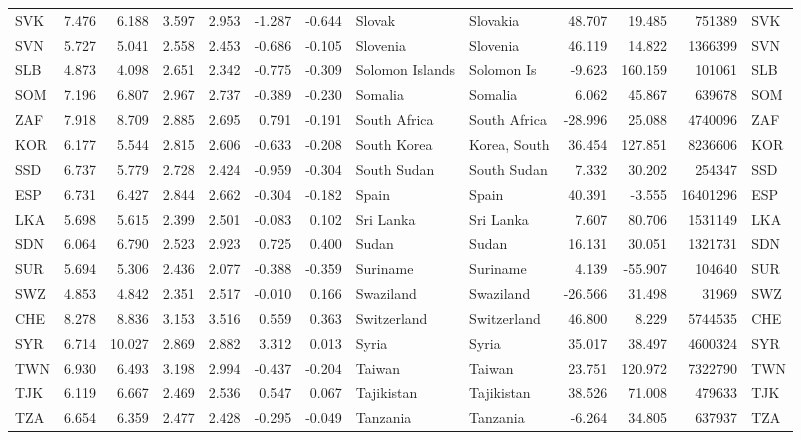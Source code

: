 \begin{tabular}{lrrrrrrllrrrl}
SVK & 7.476 & 6.188 & 3.597 & 2.953 & -1.287 & -0.644 & Slovak & Slovakia & 48.707 & 19.485 & 751389 & SVK \\
SVN & 5.727 & 5.041 & 2.558 & 2.453 & -0.686 & -0.105 & Slovenia & Slovenia & 46.119 & 14.822 & 1366399 & SVN \\
SLB & 4.873 & 4.098 & 2.651 & 2.342 & -0.775 & -0.309 & Solomon Islands & Solomon Is & -9.623 & 160.159 & 101061 & SLB \\
SOM & 7.196 & 6.807 & 2.967 & 2.737 & -0.389 & -0.230 & Somalia & Somalia & 6.062 & 45.867 & 639678 & SOM \\
ZAF & 7.918 & 8.709 & 2.885 & 2.695 & 0.791 & -0.191 & South Africa & South Africa & -28.996 & 25.088 & 4740096 & ZAF \\
KOR & 6.177 & 5.544 & 2.815 & 2.606 & -0.633 & -0.208 & South Korea & Korea, South & 36.454 & 127.851 & 8236606 & KOR \\
SSD & 6.737 & 5.779 & 2.728 & 2.424 & -0.959 & -0.304 & South Sudan & South Sudan & 7.332 & 30.202 & 254347 & SSD \\
ESP & 6.731 & 6.427 & 2.844 & 2.662 & -0.304 & -0.182 & Spain & Spain & 40.391 & -3.555 & 16401296 & ESP \\
LKA & 5.698 & 5.615 & 2.399 & 2.501 & -0.083 & 0.102 & Sri Lanka & Sri Lanka & 7.607 & 80.706 & 1531149 & LKA \\
SDN & 6.064 & 6.790 & 2.523 & 2.923 & 0.725 & 0.400 & Sudan & Sudan & 16.131 & 30.051 & 1321731 & SDN \\
SUR & 5.694 & 5.306 & 2.436 & 2.077 & -0.388 & -0.359 & Suriname & Suriname & 4.139 & -55.907 & 104640 & SUR \\
SWZ & 4.853 & 4.842 & 2.351 & 2.517 & -0.010 & 0.166 & Swaziland & Swaziland & -26.566 & 31.498 & 31969 & SWZ \\
CHE & 8.278 & 8.836 & 3.153 & 3.516 & 0.559 & 0.363 & Switzerland & Switzerland & 46.800 & 8.229 & 5744535 & CHE \\
SYR & 6.714 & 10.027 & 2.869 & 2.882 & 3.312 & 0.013 & Syria & Syria & 35.017 & 38.497 & 4600324 & SYR \\
TWN & 6.930 & 6.493 & 3.198 & 2.994 & -0.437 & -0.204 & Taiwan & Taiwan & 23.751 & 120.972 & 7322790 & TWN \\
TJK & 6.119 & 6.667 & 2.469 & 2.536 & 0.547 & 0.067 & Tajikistan & Tajikistan & 38.526 & 71.008 & 479633 & TJK \\
TZA & 6.654 & 6.359 & 2.477 & 2.428 & -0.295 & -0.049 & Tanzania & Tanzania & -6.264 & 34.805 & 637937 & TZA \\

\end{tabular}
